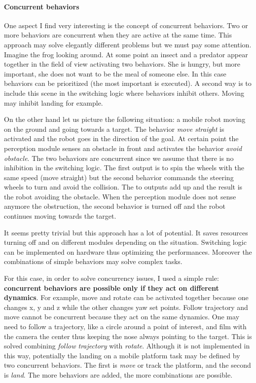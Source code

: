 \paragraph{Concurrent behaviors} One aspect I find very interesting is the concept of concurrent behaviors. Two or more behaviors are concurrent when they are active at the same time. This approach may solve elegantly different problems but we must pay some attention. Imagine the frog looking around. At some point an insect and a predator appear together in the field of view activating two behaviors. She is hungry, but more important, she does not want to be the meal of someone else. In this case behaviors can be prioritized (the most important is executed). A second way is to include this scene in the switching logic where behaviors inhibit others. Moving may inhibit landing for example. 

On the other hand let us picture the following situation: a mobile robot moving on the ground and going towards a target. The behavior \textit{move straight} is activated and the robot goes in the direction of the goal. At certain point the perception module senses an obstacle in front and activates the behavior \textit{avoid obstacle}. The two behaviors are concurrent since we assume that there is no inhibition in the switching logic. The first output is to spin the wheels with the same speed (move straight) but the second behavior commands the steering wheels to turn and avoid the collision. The to outputs add up and the result is the robot avoiding the obstacle. When the perception module does not sense anymore the obstruction, the second behavior is turned off and the robot continues moving towards the target. 

It seems pretty trivial but this approach has a lot of potential. It saves resources turning off and on different modules depending on the situation. Switching logic can be implemented on hardware thus optimizing the performances. Moreover the combinations of simple behaviors may solve complex tasks. 

For this case, in order to solve concurrency issues, I used a simple rule: \textbf{concurrent behaviors are possible only if they act on different dynamics}. For example, move and rotate can be activated together because one changes x, y and z while the other changes yaw set points. Follow trajectory and move cannot be concurrent because they act on the same dynamics. One may need to follow a trajectory, like a circle around a point of interest, and film with the camera the center thus keeping the nose always pointing to the target. This is solved combining \textit{follow trajectory} with \textit{rotate}. Although it is not implemented in this way, potentially the landing on a mobile platform task may be defined by two concurrent behaviors. The first is \textit{move} or track the platform, and the second is \textit{land}. The more behaviors are added, the more combinations are possible.

